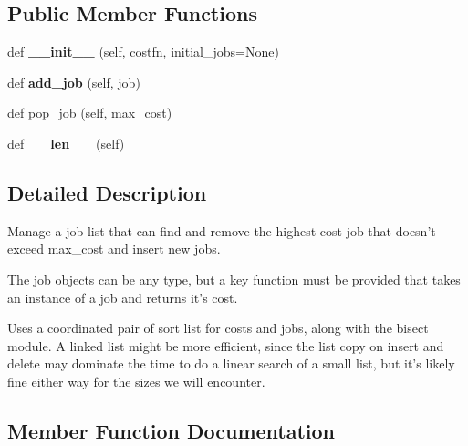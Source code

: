 \subsection*{Public Member Functions}
\begin{DoxyCompactItemize}
\item 
\mbox{\label{classcodar_1_1savanna_1_1scheduler_1_1_job_list_a692f67c81a57a97d01e899aa1f468435}} 
def {\bfseries \+\_\+\+\_\+init\+\_\+\+\_\+} (self, costfn, initial\+\_\+jobs=None)
\item 
\mbox{\label{classcodar_1_1savanna_1_1scheduler_1_1_job_list_a235fcb4111e178e10fc7ab644bf9b531}} 
def {\bfseries add\+\_\+job} (self, job)
\item 
def \hyperlink{classcodar_1_1savanna_1_1scheduler_1_1_job_list_a5aacbb616928bc7e9078ea08afe8d5ef}{pop\+\_\+job} (self, max\+\_\+cost)
\item 
\mbox{\label{classcodar_1_1savanna_1_1scheduler_1_1_job_list_a2ff2f963962e0c5cf5dac35c3cd37647}} 
def {\bfseries \+\_\+\+\_\+len\+\_\+\+\_\+} (self)
\end{DoxyCompactItemize}


\subsection{Detailed Description}
\begin{DoxyVerb}Manage a job list that can find and remove the highest cost job that
doesn't exceed max_cost and insert new jobs.

The job objects can be any type, but a key function must be provided
that takes an instance of a job and returns it's cost.

Uses a coordinated pair of sort list for costs and jobs, along with
the bisect module. A linked list might be more efficient, since the
list copy on insert and delete may dominate the time to do a linear
search of a small list, but it's likely fine either way for the
sizes we will encounter.\end{DoxyVerb}
 

\subsection{Member Function Documentation}
\mbox{\label{classcodar_1_1savanna_1_1scheduler_1_1_job_list_a5aacbb616928bc7e9078ea08afe8d5ef}} 
